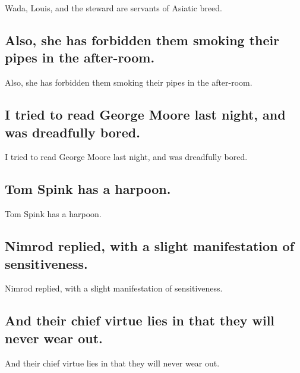 \documentclass[]{article}
\begin{document}
Wada, Louis, and the steward are servants of Asiatic breed.

\hypertarget{also-she-has-forbidden-them-smoking-their-pipes-in-the-after-room.}{%
\subsection{Also, she has forbidden them smoking their pipes in the
after-room.}\label{also-she-has-forbidden-them-smoking-their-pipes-in-the-after-room.}}

Also, she has forbidden them smoking their pipes in the after-room.

\hypertarget{i-tried-to-read-george-moore-last-night-and-was-dreadfully-bored.}{%
\subsection{I tried to read George Moore last night, and was dreadfully
bored.}\label{i-tried-to-read-george-moore-last-night-and-was-dreadfully-bored.}}

I tried to read George Moore last night, and was dreadfully bored.

\hypertarget{tom-spink-has-a-harpoon.}{%
\subsection{Tom Spink has a harpoon.}\label{tom-spink-has-a-harpoon.}}

Tom Spink has a harpoon.

\hypertarget{nimrod-replied-with-a-slight-manifestation-of-sensitiveness.}{%
\subsection{Nimrod replied, with a slight manifestation of
sensitiveness.}\label{nimrod-replied-with-a-slight-manifestation-of-sensitiveness.}}

Nimrod replied, with a slight manifestation of sensitiveness.

\hypertarget{and-their-chief-virtue-lies-in-that-they-will-never-wear-out.}{%
\subsection{And their chief virtue lies in that they will never wear
out.}\label{and-their-chief-virtue-lies-in-that-they-will-never-wear-out.}}

And their chief virtue lies in that they will never wear out.
\end{document}
